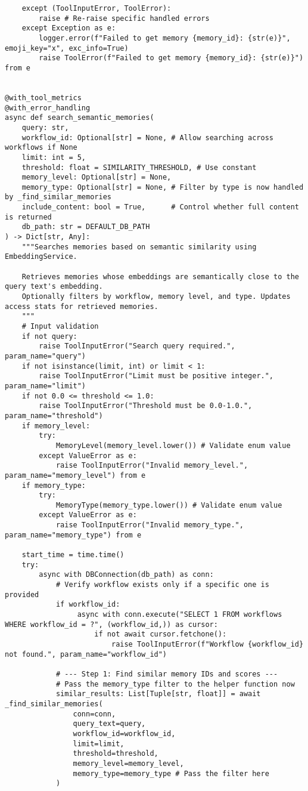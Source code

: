 \documentclass[12pt,a4paper]{article}
\begin{document}
\begin{pageablecode}
\begin{verbatim}
    except (ToolInputError, ToolError):
        raise # Re-raise specific handled errors
    except Exception as e:
        logger.error(f"Failed to get memory {memory_id}: {str(e)}", emoji_key="x", exc_info=True)
        raise ToolError(f"Failed to get memory {memory_id}: {str(e)}") from e
    

@with_tool_metrics
@with_error_handling
async def search_semantic_memories(
    query: str,
    workflow_id: Optional[str] = None, # Allow searching across workflows if None
    limit: int = 5,
    threshold: float = SIMILARITY_THRESHOLD, # Use constant
    memory_level: Optional[str] = None,
    memory_type: Optional[str] = None, # Filter by type is now handled by _find_similar_memories
    include_content: bool = True,      # Control whether full content is returned
    db_path: str = DEFAULT_DB_PATH
) -> Dict[str, Any]:
    """Searches memories based on semantic similarity using EmbeddingService.

    Retrieves memories whose embeddings are semantically close to the query text's embedding.
    Optionally filters by workflow, memory level, and type. Updates access stats for retrieved memories.
    """
    # Input validation
    if not query:
        raise ToolInputError("Search query required.", param_name="query")
    if not isinstance(limit, int) or limit < 1:
        raise ToolInputError("Limit must be positive integer.", param_name="limit")
    if not 0.0 <= threshold <= 1.0:
        raise ToolInputError("Threshold must be 0.0-1.0.", param_name="threshold")
    if memory_level:
        try:
            MemoryLevel(memory_level.lower()) # Validate enum value
        except ValueError as e:
            raise ToolInputError("Invalid memory_level.", param_name="memory_level") from e
    if memory_type:
        try:
            MemoryType(memory_type.lower()) # Validate enum value
        except ValueError as e:
            raise ToolInputError("Invalid memory_type.", param_name="memory_type") from e

    start_time = time.time()
    try:
        async with DBConnection(db_path) as conn:
            # Verify workflow exists only if a specific one is provided
            if workflow_id:
                 async with conn.execute("SELECT 1 FROM workflows WHERE workflow_id = ?", (workflow_id,)) as cursor:
                     if not await cursor.fetchone():
                         raise ToolInputError(f"Workflow {workflow_id} not found.", param_name="workflow_id")

            # --- Step 1: Find similar memory IDs and scores ---
            # Pass the memory_type filter to the helper function now
            similar_results: List[Tuple[str, float]] = await _find_similar_memories(
                conn=conn,
                query_text=query,
                workflow_id=workflow_id,
                limit=limit,
                threshold=threshold,
                memory_level=memory_level,
                memory_type=memory_type # Pass the filter here
            )


\end{verbatim}
\end{pageablecode}
\end{document}
